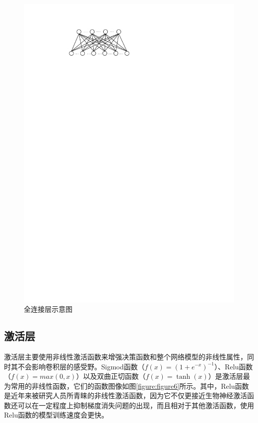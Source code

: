 \begin{figure}[htbp]
    \begin{center}
    \includegraphics{figures/fc.pdf}
    \end{center}
    \caption{全连接层示意图}\label{figure:figure5}
\end{figure}

\subsection{激活层}
\label{chapter:chapter2-1-4}
激活层主要使用非线性激活函数来增强决策函数和整个网络模型的非线性属性，同时其不会影响卷积层的感受野。Sigmod函数（$f(x)=(1+e^{-x})^{-1}$）、Relu函数（$f(x)=max(0,x)$）以及双曲正切函数（$f(x)=\tanh(x)$）是激活层最为常用的非线性函数，它们的函数图像如图\ref{figure:figure6}所示。其中，Relu函数是近年来被研究人员所青睐的非线性激活函数，因为它不仅更接近生物神经激活函数还可以在一定程度上抑制梯度消失问题的出现，而且相对于其他激活函数，使用Relu函数的模型训练速度会更快。

